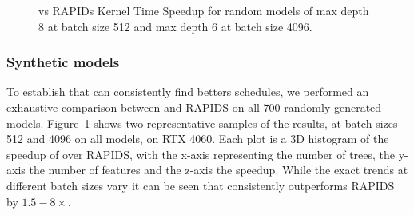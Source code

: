 \begin{figure}[htb]
\begin{minipage}[t]{.475\linewidth}
  \end{minipage}
  \caption{\label{fig:randomModels4060}\Treebeard{} vs RAPIDs Kernel Time Speedup for random models
  of max depth 8 at batch size 512 and max depth 6 at batch size 4096.}
\end{figure}

\subsubsection*{Synthetic models}
To establish that \Treebeard{} can consistently find betters schedules, we performed an exhaustive comparison between \Treebeard{} and RAPIDS on all 700 randomly generated models.   
Figure~\ref{fig:randomModels4060} shows two representative samples of the results, at batch sizes 512 and 4096 on all models, on RTX 4060. 
Each plot is a 3D histogram of the speedup of \Treebeard{} over RAPIDS, with the x-axis representing the number of trees, the y-axis the number of features and the z-axis the speedup. 
While the exact trends at different batch sizes vary it can be seen that \Treebeard{} consistently outperforms RAPIDS by $1.5-8\times$. 
